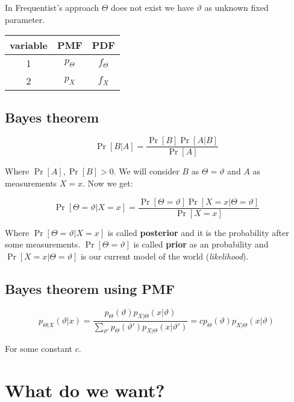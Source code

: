 \begin{rem}
	In Frequentist's approach $\Theta$ does not exist we have $\vartheta$ as unknown fixed \newline parameter.
\end{rem}

\begin{table}\centering
	\begin{tabular}{| c | c | c |}
		variable & PMF          & PDF          \\
		\hline
		1 & $p_{\Theta}$ & $f_{\Theta}$ \\
		2 & $p_{X}$ & $f_{X}$ \\
	\end{tabular}
\end{table}

\subsection{Bayes theorem}

$$
\Pr[B \vert A] = \frac{\Pr[B] \Pr[A \vert B]}{\Pr[A]}
$$

Where $\Pr[A], \Pr[B] > 0$. We will consider $B$ as $\Theta = \vartheta$ and $A$ as measurements $X = x$. Now we get:

$$
\Pr[\Theta = \vartheta \vert X = x] = \frac{\Pr[\Theta = \vartheta] \Pr[X = x \vert \Theta = \vartheta]}{\Pr[X = x]}
$$

Where $\Pr[\Theta = \vartheta \vert X = x]$ is called \textbf{posterior} and it is the probability after some measurements. $\Pr[\Theta = \vartheta]$ is called \textbf{prior} as an probability and $\Pr[X = x \vert \Theta = \vartheta]$ is our current model of the world (\textit{likelihood}).

\subsection{Bayes theorem using PMF}

$$
p_{\Theta\vert X} (\vartheta \vert x) = \frac{p_{\Theta}(\vartheta) p_{X\vert\Theta}(x \vert \vartheta)}{\sum_{\vartheta'} p_{\Theta}(\vartheta')p_{X\vert\Theta}(x \vert \vartheta')} = c p_{\Theta}(\vartheta) p_{X \vert \Theta}(x \vert \vartheta)
$$

For some constant $c$.

\section{What do we want?}

